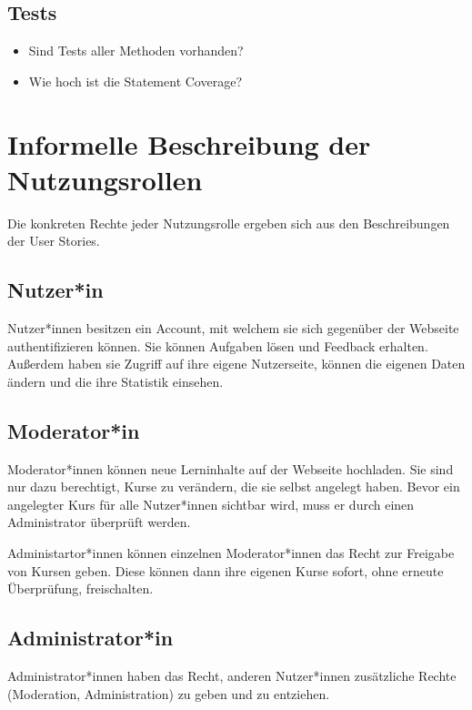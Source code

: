 \begin{multicols}{2}
	\subsection{Tests}
	\begin{itemize}
		\item Sind Tests aller Methoden vorhanden?
		\item Wie hoch ist die Statement Coverage?
	\end{itemize}
\end{multicols}

\section{Informelle Beschreibung der Nutzungsrollen}
Die konkreten Rechte jeder Nutzungsrolle ergeben sich aus den Beschreibungen der User Stories.

\subsection{Nutzer*in}
Nutzer*innen besitzen ein Account, mit welchem sie sich gegenüber der Webseite authentifizieren können. Sie können Aufgaben lösen und Feedback erhalten. Außerdem haben sie Zugriff auf ihre eigene Nutzerseite, können die eigenen Daten ändern und die ihre Statistik einsehen.

\subsection{Moderator*in}
Moderator*innen können neue Lerninhalte auf der Webseite hochladen. Sie sind nur dazu berechtigt, Kurse zu verändern, die sie selbst angelegt haben. Bevor ein angelegter Kurs für alle Nutzer*innen sichtbar wird, muss er durch einen Administrator überprüft werden.

Administartor*innen können einzelnen Moderator*innen das Recht zur Freigabe von Kursen geben. Diese können dann ihre eigenen Kurse sofort, ohne erneute Überprüfung, freischalten.

\subsection{Administrator*in}
Administrator*innen haben das Recht, anderen Nutzer*innen zusätzliche Rechte (Moderation, Administration) zu geben und zu entziehen.

